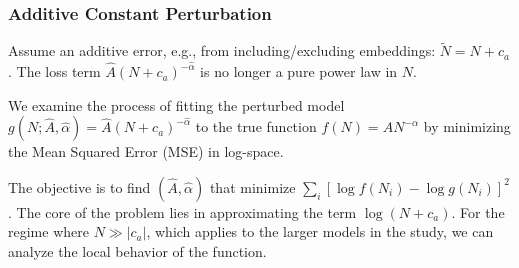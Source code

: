 






\subsubsection{Additive Constant Perturbation}
\label{app:theoretical_analysis:subsec:additive}

Assume an additive error, e.g., from including/excluding embeddings: $\tilde{N} = N + c_a$. The loss term $\hat{A}(N+c_a)^{-\hat{\alpha}}$ is no longer a pure power law in $N$.

We examine the process of fitting the perturbed model $g(N; \hat{A}, \hat{\alpha}) = \hat{A}(N+c_a)^{-\hat{\alpha}}$ to the true function $f(N) = AN^{-\alpha}$ by minimizing the Mean Squared Error (MSE) in log-space.

The objective is to find $(\hat{A}, \hat{\alpha})$ that minimize $\sum_i [ \log f(N_i) - \log g(N_i) ]^2$.
The core of the problem lies in approximating the term $\log(N+c_a)$. For the regime where $N \gg |c_a|$, which applies to the larger models in the study, we can analyze the local behavior of the function.

